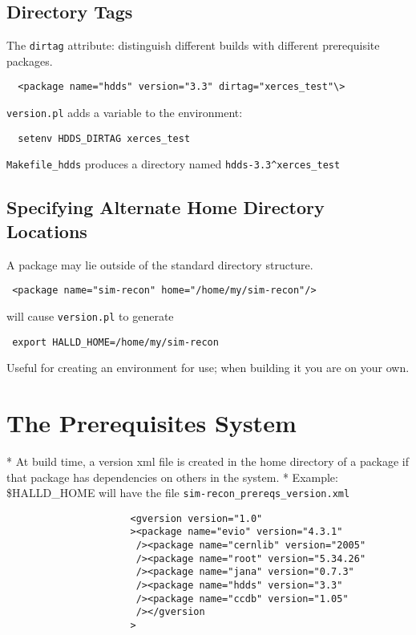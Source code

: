 \documentclass[12pt]{article}
\begin{document}
\subsection{Directory Tags}\label{section:directory-tags}

The {\tt dirtag} attribute: distinguish different builds with different prerequisite packages.
\begin{verbatim}
  <package name="hdds" version="3.3" dirtag="xerces_test"\>
\end{verbatim}
{\tt version.pl} adds a variable to the environment:
\begin{verbatim}
  setenv HDDS_DIRTAG xerces_test
\end{verbatim}
{\tt Makefile\_hdds} produces a directory named {\tt hdds-3.3\^{}xerces\_test}

\subsection{Specifying Alternate Home Directory Locations}

A package may lie outside of the standard directory structure.
\begin{center} \tt
<package name="sim-recon" home="/home/my/sim-recon"/>
\end{center}
will cause {\tt version.pl} to generate
\begin{center} \tt
export HALLD\_HOME=/home/my/sim-recon
\end{center}
Useful for creating an environment for use; when building it you are on your own.

\section{The Prerequisites System}\label{section:prerequisites-system}

* At build time, a version xml file is created in the home directory of
a package if that package has dependencies on others in the
system.
* Example: \$HALLD\_HOME will have the file {\tt sim-recon\_prereqs\_version.xml}

\begin{figure}
\begin{verbatim}
                <gversion version="1.0"
                ><package name="evio" version="4.3.1"
                 /><package name="cernlib" version="2005"
                 /><package name="root" version="5.34.26"
                 /><package name="jana" version="0.7.3"
                 /><package name="hdds" version="3.3"
                 /><package name="ccdb" version="1.05"
                 /></gversion
                >
\end{verbatim}
\end{figure}
\end{document}
